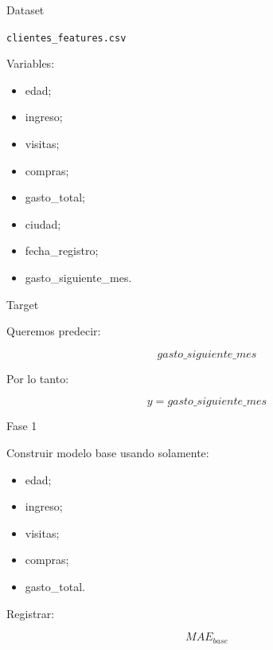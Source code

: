 \documentclass[aspectratio=169,11pt]{beamer}
\begin{document}

\begin{frame}{Dataset}

\begin{center}

\Large
\texttt{clientes\_features.csv}
\end{center}

Variables:

\begin{itemize}

    \item edad;

    \item ingreso;

    \item visitas;

    \item compras;

    \item gasto\_total;

    \item ciudad;

    \item fecha\_registro;

    \item gasto\_siguiente\_mes.

\end{itemize}

\end{frame}


\begin{frame}{Target}

Queremos predecir:

\[
\boxed{
gasto\_siguiente\_mes
}
\]

Por lo tanto:

\[
y
=
gasto\_siguiente\_mes
\]

\end{frame}


\begin{frame}{Fase 1}

Construir modelo base usando solamente:

\begin{itemize}

    \item edad;

    \item ingreso;

    \item visitas;

    \item compras;

    \item gasto\_total.

\end{itemize}

Registrar:

\[
MAE_{base}
\]

\end{frame}
\end{document}
